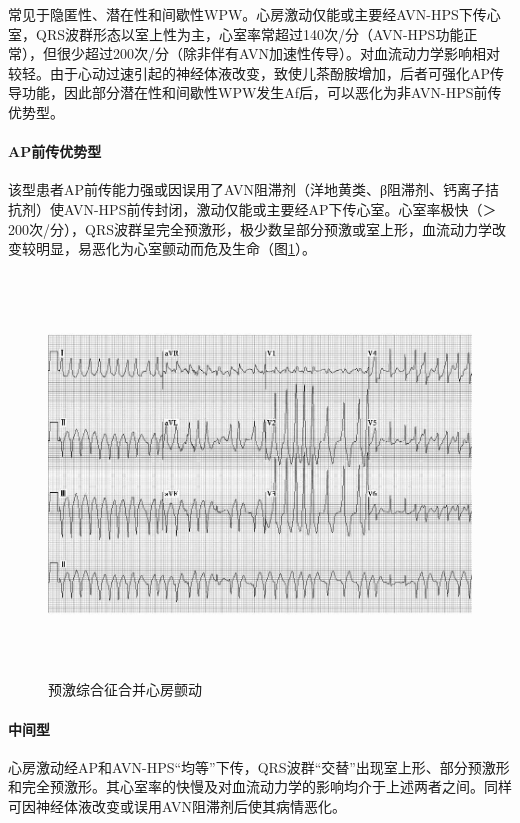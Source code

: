 常见于隐匿性、潜在性和间歇性WPW。心房激动仅能或主要经AVN-HPS下传心室，QRS波群形态以室上性为主，心室率常超过140次/分（AVN-HPS功能正常），但很少超过200次/分（除非伴有AVN加速性传导）。对血流动力学影响相对较轻。由于心动过速引起的神经体液改变，致使儿茶酚胺增加，后者可强化AP传导功能，因此部分潜在性和间歇性WPW发生Af后，可以恶化为非AVN-HPS前传优势型。

\paragraph{AP前传优势型}

该型患者AP前传能力强或因误用了AVN阻滞剂（洋地黄类、β阻滞剂、钙离子拮抗剂）使AVN-HPS前传封闭，激动仅能或主要经AP下传心室。心室率极快（＞
200次/分），QRS波群呈完全预激形，极少数呈部分预激或室上形，血流动力学改变较明显，易恶化为心室颤动而危及生命（图\ref{fig102-13}）。

\begin{figure}[!htbp]
 \centering
 \includegraphics[width=6.29167in,height=4.19792in]{./images/Image00449.jpg}
 \captionsetup{justification=centering}
 \caption{预激综合征合并心房颤动}
 \label{fig102-13}
  \end{figure} 

\paragraph{中间型}

心房激动经AP和AVN-HPS“均等”下传，QRS波群“交替”出现室上形、部分预激形和完全预激形。其心室率的快慢及对血流动力学的影响均介于上述两者之间。同样可因神经体液改变或误用AVN阻滞剂后使其病情恶化。

